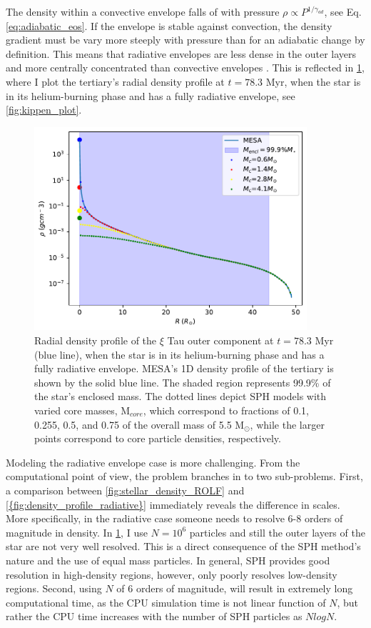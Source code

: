 The density within a convective envelope falls of with pressure $\rho \propto P^{1/\gamma_{ad}}$, see Eq. \eqref{eq:adiabatic_eos}. If the envelope is stable against convection, the density gradient must be vary more steeply with pressure than for an adiabatic change by definition. This means that radiative envelopes are less dense in the outer layers and more centrally concentrated than convective envelopes \cite{pols2011stellar}. This is reflected in \cref{fig:density_profile_radiative}, where I plot the tertiary's radial density profile at $t=78.3$ Myr, when the star is in its helium-burning phase and has a fully radiative envelope, see \cref{fig:kippen_plot}.
\begin{figure}[H]
    \centering
    \includegraphics[width=0.9\textwidth]{Thesis/graphs/density_profile_radiative_envelope.pdf}
    \caption{Radial density profile of the  $\xi$ Tau outer component at $t=78.3$ Myr (blue line), when the star is in its helium-burning phase and has a fully radiative envelope. MESA's 1D density profile of the tertiary is shown by the solid blue line. The shaded region represents 99.9\% of the star's enclosed mass. The dotted lines depict SPH models with varied core masses, M$_{core}$, which correspond to fractions of 0.1, 0.255, 0.5, and 0.75 of the overall mass of 5.5 M$_{\odot}$, while the larger points correspond to core particle densities, respectively.}
    \label{fig:density_profile_radiative}
\end{figure}
Modeling the radiative envelope case is more challenging. From the computational point of view, the problem branches in to two sub-problems. First, a comparison between \cref{fig:stellar_density_ROLF} and \cref{{fig:density_profile_radiative}} immediately reveals the difference in scales. More specifically, in the radiative case someone needs to resolve 6-8 orders of magnitude in density. In \cref{fig:density_profile_radiative}, I use $N=10^6$ particles and still the outer layers of the star are not very well resolved. This is a direct consequence of the SPH method's nature and the use of equal mass particles. In general, SPH provides good resolution in high-density regions, however, only poorly resolves low-density regions. Second, using $N$ of 6 orders of magnitude, will result in extremely long computational time, as the CPU simulation time is not linear function of $N$, but rather the CPU time increases with the number of SPH particles as $NlogN$.


